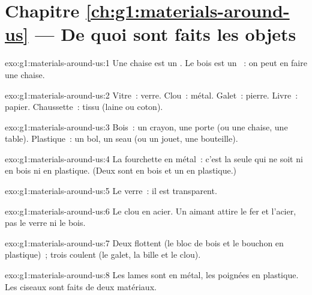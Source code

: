 \section*{Chapitre \ref{ch:g1:materials-around-us} --- De quoi sont faits les objets}

\begin{solution}{exo:g1:materials-around-us:1}
Une chaise est un . Le bois est un ~: on peut en faire une
chaise.
\end{solution}

\begin{solution}{exo:g1:materials-around-us:2}
Vitre~: verre. Clou~: métal. Galet~: pierre. Livre~: papier. Chaussette~:
tissu (laine ou coton).
\end{solution}

\begin{solution}{exo:g1:materials-around-us:3}
Bois~: un crayon, une porte (ou une chaise, une table). Plastique~: un
bol, un seau (ou un jouet, une bouteille).
\end{solution}

\begin{solution}{exo:g1:materials-around-us:4}
La fourchette en métal~: c'est la seule qui ne soit ni en bois ni en
plastique. (Deux  sont en bois et un en plastique.)
\end{solution}

\begin{solution}{exo:g1:materials-around-us:5}
Le verre~: il est transparent.
\end{solution}

\begin{solution}{exo:g1:materials-around-us:6}
Le clou en acier. Un aimant attire le fer et l'acier, pas le verre ni le
bois.
\end{solution}

\begin{solution}{exo:g1:materials-around-us:7}
Deux  flottent (le bloc de bois et le bouchon en plastique)~; trois
coulent (le galet, la bille et le clou).
\end{solution}

\begin{solution}{exo:g1:materials-around-us:8}
Les lames sont en métal, les poignées en plastique. Les ciseaux sont
faits de deux matériaux.
\end{solution}

